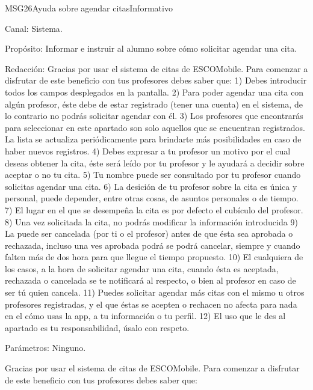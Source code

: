 \begin{mensaje}{MSG26}{Ayuda sobre agendar citas}{Informativo}
	\item[Canal:] Sistema.
    \item[Propósito:] Informar e instruir al alumno sobre cómo solicitar agendar una cita. 
    \item[Redacción:] 
		Gracias por usar el sistema de citas de ESCOMobile.
		Para comenzar a disfrutar de este beneficio con tus profesores debes saber que:
		1) Debes introducir todos los campos desplegados en la pantalla.
		2) Para poder agendar una cita con algún profesor, éste debe de estar registrado (tener una cuenta) en el sistema, de lo contrario no podrás solicitar agendar con él. 
		3) Los profesores que encontrarás para seleccionar en este apartado son solo aquellos que se encuentran registrados. La lista se actualiza periódicamente para brindarte más posibilidades en caso de haber nuevos registros.  
		4) Debes expresar a tu profesor un motivo por el cual deseas obtener la cita, éste será leído por tu profesor y le ayudará a decidir sobre aceptar o no tu cita.
		5) Tu nombre puede ser consultado por tu profesor cuando solicitas agendar una cita.
		6) La desición de tu profesor sobre la cita es única y personal, puede depender, entre otras cosas, de asuntos personales o de tiempo.
		7) El lugar en el que se desempeña la cita es por defecto el cubículo del profesor.
		8) Una vez solicitada la cita, no podrás modificar la información introducida
		9) La puede ser cancelada (por ti o el profesor) antes de que ésta sea aprobada o rechazada, incluso una ves aprobada podrá se podrá cancelar, siempre y cuando falten más de dos hora para que llegue el tiempo propuesto.
		10) El cualquiera de los casos, a la hora de solicitar agendar una cita, cuando ésta es aceptada, rechazada o cancelada se te notificará al respecto, o bien al profesor en caso de ser tú quien cancela.
		11) Puedes solicitar agendar más citas con el mismo u otros profesores registradas, y el que éstas se acepten o rechacen no afecta para nada en el cómo usas la app, a tu información o tu perfil. 
		12) El uso que le des al apartado es tu responsabilidad, úsalo con respeto.				  
    \item[Parámetros:] Ninguno.	

\end{mensaje}

Gracias por usar el sistema de citas de ESCOMobile.
Para comenzar a disfrutar de este beneficio con tus profesores debes saber que: